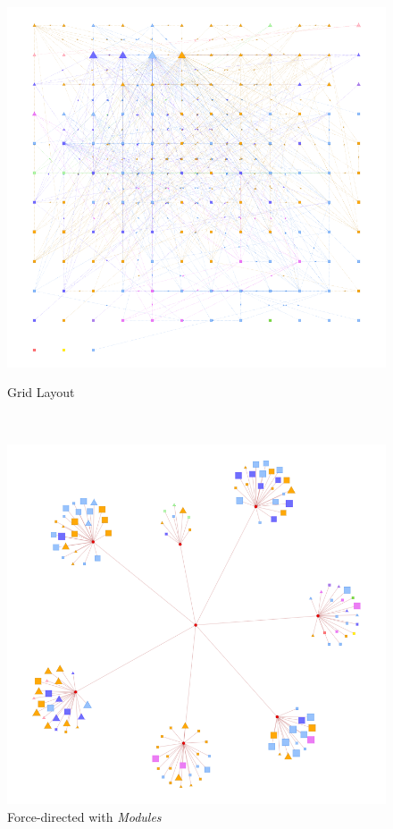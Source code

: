 \begin{figure}[tp]

  \begin{minipage}{0.5\textwidth}
    \centering
    \includegraphics[width=\textwidth]{img/regexp/grid.png}
    \caption{Grid Layout}\label{fig:regexp:grid}
  \end{minipage}~%
  \begin{minipage}{0.5\textwidth}
    \centering
    \includegraphics[width=\textwidth]{img/regexp/module.png}
    \caption{Force-directed with \emph{Modules}}\label{fig:regexp:module}
  \end{minipage}
\end{figure}


